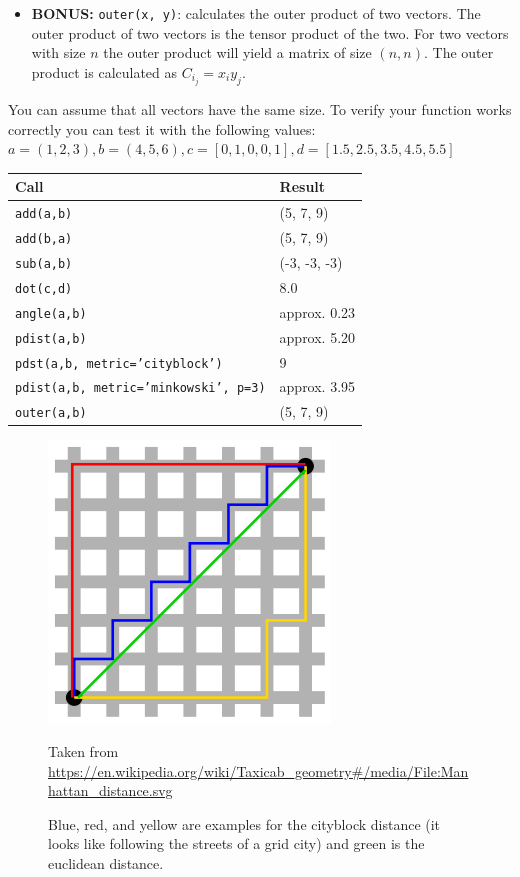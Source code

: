 \begin{itemize}
  \item \textbf{BONUS:} \texttt{outer(x, y)}: calculates the outer product of two vectors. The outer product of two vectors is the tensor product of the two. For two vectors with size $n$ the outer product will yield a matrix of size $(n, n)$.
  The outer product is calculated as $C_{i_j} = x_iy_j$.
\end{itemize}
You can assume that all vectors have the same size. To verify your function works correctly you can test it with the following values:\\
$a = (1, 2, 3), b = (4, 5, 6), c = [0, 1, 0, 0, 1], d = [1.5, 2.5, 3.5, 4.5, 5.5]$\\
\begin{tabular}{|ll|}
  \hline
  Call & Result \\
  \hline
  \texttt{add(a,b)} & (5, 7, 9)\\
  \texttt{add(b,a)} & (5, 7, 9)\\
  \texttt{sub(a,b)} & (-3, -3, -3)\\
  \texttt{dot(c,d)} & 8.0\\
  \texttt{angle(a,b)} & approx. 0.23\\
  \texttt{pdist(a,b)} & approx. 5.20\\
  \texttt{pdst(a,b, metric='cityblock')} & 9\\
  \texttt{pdist(a,b, metric='minkowski', p=3)} & approx. 3.95\\
  \texttt{outer(a,b)} & (5, 7, 9)\\
  \hline
\end{tabular}
\begin{figure}[h]
  \includegraphics[scale=0.5]{metriken}
  \label{fig:metrics}
  \caption{Blue, red, and yellow are examples for the cityblock distance (it looks like following the streets of a grid city) and green is the euclidean distance.}
  \small{Taken from \url{https://en.wikipedia.org/wiki/Taxicab_geometry#/media/File:Manhattan_distance.svg}}
  
\end{figure}

